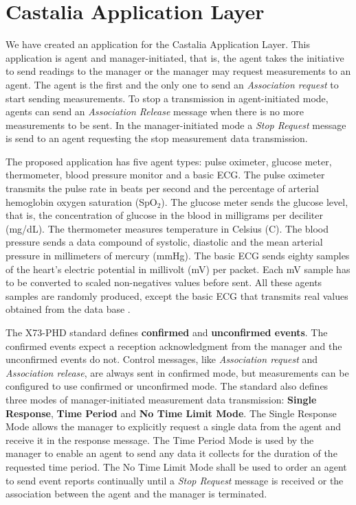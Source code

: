\section{Castalia Application Layer}\label{castaliaapplayer}

We have created an application for the Castalia Application Layer. This application is agent and manager-initiated, that is, the agent takes the initiative to send readings to the manager or the manager may request measurements to an agent. The agent is the first and the only one to send an \textit{Association request} to start sending measurements. To stop a transmission in agent-initiated mode, agents can send an \textit{Association Release} message when there is no more measurements to be sent. In the manager-initiated mode a \textit{Stop Request} message is send to an agent requesting the stop measurement data transmission.

The proposed application has five agent types: pulse oximeter, glucose meter, thermometer, blood pressure monitor and a basic ECG. The pulse oximeter transmits the pulse rate in beats per second and the percentage of arterial hemoglobin oxygen saturation (SpO$_2$). The glucose meter sends the glucose level, that is, the concentration of glucose in the blood in milligrams per deciliter (mg\//dL). The thermometer measures temperature in Celsius (\textdegree C). The blood pressure sends a data compound of systolic, diastolic and the mean arterial pressure in millimeters of mercury (mmHg). The basic ECG sends eighty samples of the heart's electric potential in millivolt (mV) per packet. Each mV sample has to be converted to scaled non-negatives values before sent. 
All these agents samples are randomly produced, except the basic ECG that transmits real values obtained from the data base \cite{b2}.

The X73-PHD standard defines \textbf{confirmed} and  \textbf{unconfirmed events}. The confirmed events expect a reception acknowledgment from the manager and the unconfirmed events do not. Control messages, like \textit{Association request} and \textit{Association release}, are always sent in confirmed mode, but measurements can be configured to use confirmed or unconfirmed mode.
The standard also defines three modes of manager-initiated measurement data transmission: \textbf{Single Response}, \textbf{Time Period} and \textbf{No Time Limit Mode}. The Single Response Mode allows the manager to explicitly request a single data from the agent and receive it in the response message.  The Time Period Mode is used by the manager to enable an agent to send any data it collects for the duration of the requested time period. The No Time Limit Mode shall be used to order an agent to send event reports continually until a \textit{Stop Request} message is received or the association between the agent and the manager is terminated.

